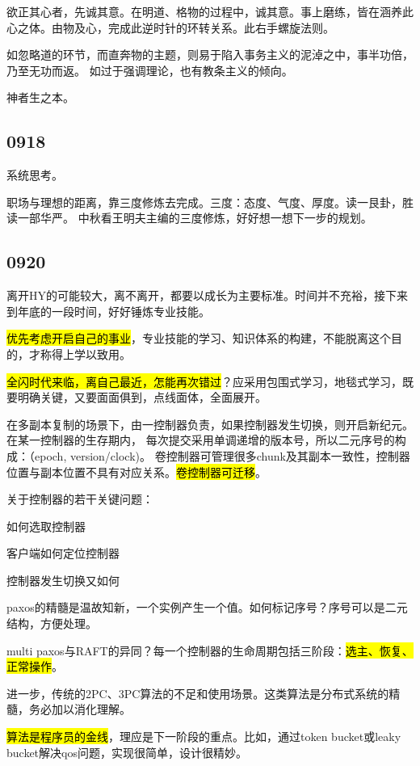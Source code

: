 欲正其心者，先诚其意。在明道、格物的过程中，诚其意。事上磨练，皆在涵养此心之体。由物及心，完成此逆时针的环转关系。此右手螺旋法则。

如忽略道的环节，而直奔物的主题，则易于陷入事务主义的泥淖之中，事半功倍，乃至无功而返。
如过于强调理论，也有教条主义的倾向。

神者生之本。

\subsection{0918}

系统思考。

职场与理想的距离，靠三度修炼去完成。三度：态度、气度、厚度。读一艮卦，胜读一部华严。
中秋看王明夫主编的三度修炼，好好想一想下一步的规划。

\subsection{0920}

离开HY的可能较大，离不离开，都要以成长为主要标准。时间并不充裕，接下来到年底的一段时间，好好锤炼专业技能。

\hl{优先考虑开启自己的事业}，专业技能的学习、知识体系的构建，不能脱离这个目的，才称得上学以致用。

\hl{全闪时代来临，离自己最近，怎能再次错过}？应采用包围式学习，地毯式学习，既要明确关键，又要面面俱到，点线面体，全面展开。

在多副本复制的场景下，由一控制器负责，如果控制器发生切换，则开启新纪元。在某一控制器的生存期内，
每次提交采用单调递增的版本号，所以二元序号的构成：（epoch, version/clock)。
卷控制器可管理很多chunk及其副本一致性，控制器位置与副本位置不具有对应关系。\hl{卷控制器可迁移}。

关于控制器的若干关键问题：
\begin{enumbox}
\item 如何选取控制器
\item 客户端如何定位控制器
\item 控制器发生切换又如何
\end{enumbox}

paxos的精髓是温故知新，一个实例产生一个值。如何标记序号？序号可以是二元结构，方便处理。

multi paxos与RAFT的异同？每一个控制器的生命周期包括三阶段：\hl{选主、恢复、正常操作}。

进一步，传统的2PC、3PC算法的不足和使用场景。这类算法是分布式系统的精髓，务必加以消化理解。

\hl{算法是程序员的金线}，理应是下一阶段的重点。比如，通过token bucket或leaky bucket解决qos问题，实现很简单，设计很精妙。


